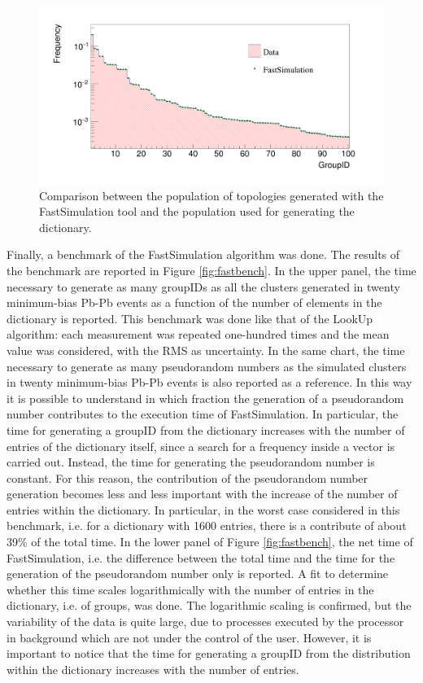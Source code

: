 \begin{figure}
  \centering
  \includegraphics[scale=0.2]{figures/fastcomp.png}
  \caption{Comparison between the population of topologies generated with the FastSimulation tool and the population used for generating the dictionary.}
  \label{fig:fastcomp}
\end{figure}
%
Finally, a benchmark of the FastSimulation algorithm was done. The results of the benchmark are reported in Figure \ref{fig:fastbench}. In the upper panel, the time necessary to generate as many groupIDs as all the clusters generated in twenty minimum-bias Pb-Pb events as a function of the number of elements in the dictionary is reported. This benchmark was done like that of the LookUp algorithm: each measurement was repeated one-hundred times and the mean value was considered, with the RMS as uncertainty. In the same chart, the time necessary to generate as many pseudorandom numbers as the simulated clusters in twenty minimum-bias Pb-Pb events is also reported as a reference. In this way it is possible to understand in which fraction the generation of a pseudorandom number contributes to the execution time of FastSimulation. In particular, the time for generating a groupID from the dictionary increases with the number of entries of the dictionary itself, since a search for a frequency inside a vector is carried out. Instead, the time for generating the pseudorandom number is constant. For this reason, the contribution of the pseudorandom number generation becomes less and less important with the increase of the number of entries within the dictionary. In particular, in the worst case considered in this benchmark, i.e. for a dictionary with 1600 entries, there is a contribute of about 39\% of the total time. In the lower panel of Figure \ref{fig:fastbench}, the net time of FastSimulation, i.e. the difference between the total time and the time for the generation of the pseudorandom number only is reported. A fit to determine whether this time scales logarithmically with the number of entries in the dictionary, i.e. of groups, was done. The logarithmic scaling is confirmed, but the variability of the data is quite large, due to processes executed by the processor in background which are not under the control of the user. However, it is important to notice that the time for generating a groupID from the distribution within the dictionary increases with the number of entries.
